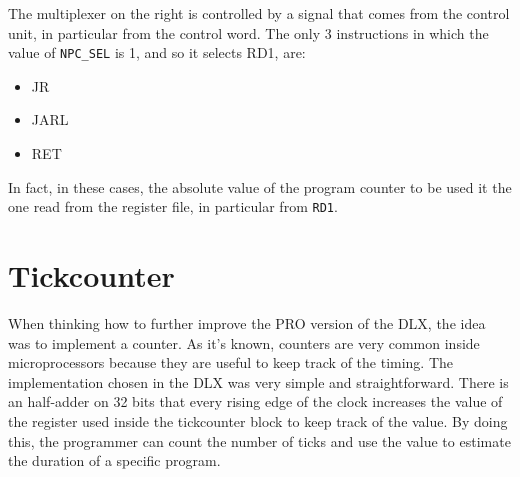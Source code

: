 The multiplexer on the right is controlled by a signal that comes from the control unit, in particular from the control word. The only 3 instructions in which the value of \texttt{NPC\_SEL} is 1, and so it selects RD1, are:

\begin{itemize}
  \item JR
  \item JARL
  \item RET
\end{itemize}

In fact, in these cases, the absolute value of the program counter to be used it the one read from the register file, in particular from \texttt{RD1}.

\section{Tickcounter}
When thinking how to further improve the PRO version of the DLX, the idea was to implement a counter. As it's known, counters are very common inside microprocessors because they are useful to keep track of the timing. 
The implementation chosen in the DLX was very simple and straightforward. There is an half-adder on 32 bits that every rising edge of the clock increases the value of the register used inside the tickcounter block to keep track of the value. By doing this, the programmer can count the number of ticks and use the value to estimate the duration of a specific program. 
